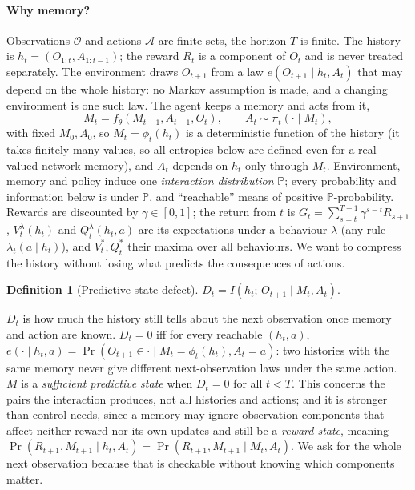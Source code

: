 \documentclass[11pt]{article}
\theoremstyle{plain}
\theoremstyle{definition}
\newtheorem{definition}[theorem]{Definition}
\theoremstyle{remark}
\newcommand{\PP}{\mathbb{P}}
\newcommand{\calA}{\mathcal{A}}
\newcommand{\calO}{\mathcal{O}}
\begin{document}
\paragraph{Why memory?}
Observations $\calO$ and actions $\calA$ are finite sets, the horizon $T$ is finite. The history is $h_t = (O_{1:t}, A_{1:t-1})$; the reward $R_t$ is a component of $O_t$ and is never treated separately. The environment draws $O_{t+1}$ from a law $e(O_{t+1} \mid h_t, A_t)$ that may depend on the whole history: no Markov assumption is made, and a changing environment is one such law. The agent keeps a memory and acts from it,
\begin{equation}
M_t = f_\theta(M_{t-1}, A_{t-1}, O_t), \qquad A_t \sim \pi_t(\cdot \mid M_t), \label{eq:agent}
\end{equation}
with fixed $M_0, A_0$, so $M_t = \phi_t(h_t)$ is a deterministic function of the history (it takes finitely many values, so all entropies below are defined even for a real-valued network memory), and $A_t$ depends on $h_t$ only through $M_t$. Environment, memory and policy induce one \emph{interaction distribution} $\PP$; every probability and information below is under $\PP$, and ``reachable'' means of positive $\PP$-probability. Rewards are discounted by $\gamma \in [0, 1]$; the return from $t$ is $G_t = \sum_{s=t}^{T-1} \gamma^{s-t} R_{s+1}$, $V^\lambda_t(h_t)$ and $Q^\lambda_t(h_t, a)$ are its expectations under a behaviour $\lambda$ (any rule $\lambda_t(a \mid h_t)$), and $V^*_t, Q^*_t$ their maxima over all behaviours. We want to compress the history without losing what predicts the consequences of actions.
\begin{definition}[Predictive state defect]
$D_t = I(h_t;\, O_{t+1} \mid M_t, A_t)$.
\end{definition}
$D_t$ is how much the history still tells about the next observation once memory and action are known. $D_t = 0$ iff for every reachable $(h_t, a)$, $e(\cdot \mid h_t, a) = \Pr(O_{t+1} \in \cdot \mid M_t = \phi_t(h_t), A_t = a)$: two histories with the same memory never give different next-observation laws under the same action. $M$ is a \emph{sufficient predictive state} when $D_t = 0$ for all $t < T$. This concerns the pairs the interaction produces, not all histories and actions; and it is stronger than control needs, since a memory may ignore observation components that affect neither reward nor its own updates and still be a \emph{reward state}, meaning $\Pr(R_{t+1}, M_{t+1} \mid h_t, A_t) = \Pr(R_{t+1}, M_{t+1} \mid M_t, A_t)$. We ask for the whole next observation because that is checkable without knowing which components matter.
\end{document}
